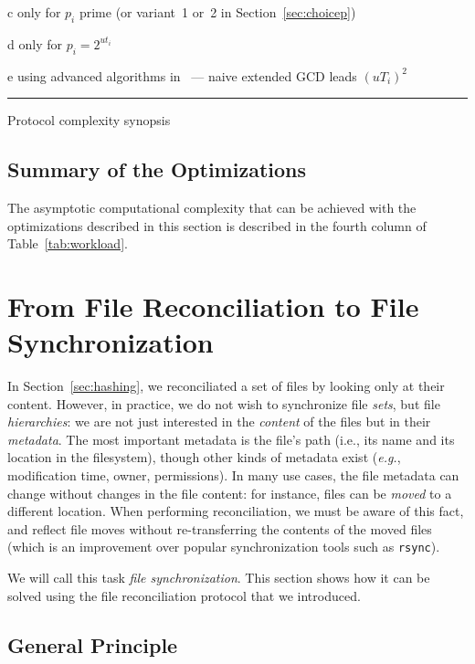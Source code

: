 \documentclass[11pt]{llncs}
\newcommand{\rsync}{\texttt{rsync}\xspace}
\newcommand{\eg}{\textit{e.g.}\xspace}
\begin{document}
\begin{table}[ht]
\begin{threeparttable}
\begin{tablenotes}
    \item[c] only for $p_i$ prime (or variant~1 or~2 in Section~\ref{sec:choicep})
    \item[d] only for $p_i = 2^{ut_i}$
    \item[e] using advanced algorithms in~\cite{pan2004rational,wang2003acceleration} --- naive extended GCD leads $(uT_i)^2$\smallskip
  \end{tablenotes}
 \end{threeparttable}
 \rule{\textwidth}{1pt}
  \caption{Protocol complexity synopsis}
  \label{tab:workload}
\end{table}

\subsection{Summary of the Optimizations}

The asymptotic computational complexity that can be achieved with the optimizations described in this section is described in the fourth column of Table~\ref{tab:workload}.
\section{From File Reconciliation to File Synchronization}
\label{sec:files}

In Section~\ref{sec:hashing}, we reconciliated a set of files by looking only at their content.
However, in practice, we do not wish to synchronize file \emph{sets}, but file
\emph{hierarchies}: we are not just interested in the \emph{content} of the
files but in their \emph{metadata}. The most important metadata is the file's
path (i.e., its name and its location in the filesystem), though other kinds of
metadata exist (\eg, modification time, owner, permissions). In many use
cases, the file metadata can change without changes in the file content: for
instance, files can be \emph{moved} to a different location. When performing
reconciliation, we must be aware of this fact, and reflect file moves without
re-transferring the contents of the moved files (which is an improvement over
popular synchronization tools such as \rsync).

We will call this task \emph{file synchronization}. This section shows how it can be solved using the file reconciliation protocol that we introduced.

\subsection{General Principle}
\end{document}
